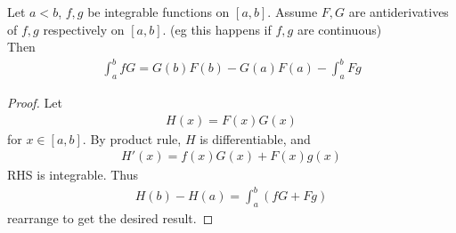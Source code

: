 \documentclass[a4paper]{article}
\begin{document}
\begin{coro}
Let $a<b$, $f,g$ be integrable functions on $\left[a,b\right]$. Assume $F,G$ are antiderivatives of $f,g$ respectively on $\left[a,b\right]$. (eg this happens if $f,g$ are continuous)\\
Then
\begin{equation*}
\begin{aligned}
\int_a^b fG = G\left(b\right) F\left(b\right) - G\left(a\right)F\left(a\right) - \int_a^b Fg
\end{aligned}
\end{equation*}
\begin{proof}
Let
\begin{equation*}
\begin{aligned}
H\left(x\right) = F\left(x\right)G\left(x\right)
\end{aligned}
\end{equation*}
for $x\in\left[a,b\right]$. By product rule, $H$ is differentiable, and
\begin{equation*}
\begin{aligned}
H'\left(x\right) = f\left(x\right)G\left(x\right) + F\left(x\right) g\left(x\right)
\end{aligned}
\end{equation*}
RHS is integrable. Thus
\begin{equation*}
\begin{aligned}
H\left(b\right)-H\left(a\right) = \int_a^b \left(fG+Fg\right)
\end{aligned}
\end{equation*}
rearrange to get the desired result.
\end{proof}
\end{coro}
\end{document}
